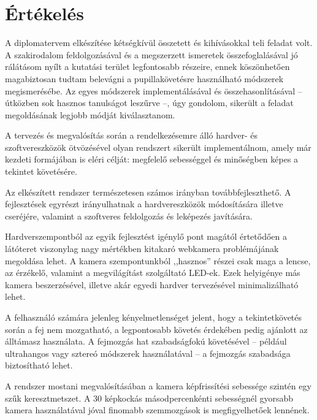 \chapter*{Értékelés}\label{sect:ertekeles}

A diplomatervem elkészítése kétségkívül összetett és kihívásokkal teli feladat volt. A szakirodalom feldolgozásával és a megszerzett ismeretek összefoglalásával jó rálátásom nyílt a kutatási terület legfontosabb részeire, ennek köszönhetően magabiztosan tudtam belevágni a pupillakövetésre használható módszerek megismerésébe. Az egyes módszerek implementálásával és összehasonlításával -- útközben sok hasznos tanulságot leszűrve --, úgy gondolom, sikerült a feladat megoldásának legjobb módját kiválasztanom.

A tervezés és megvalósítás során a rendelkezésemre álló hardver- és szoftvereszközök ötvözésével olyan rendszert sikerült implementálnom, amely már kezdeti formájában is eléri célját: megfelelő sebességgel és minőségben képes a tekintet követésére.

\bigskip

Az elkészített rendszer természetesen számos irányban továbbfejleszthető. A fejlesztések egyrészt irányulhatnak a hardvereszközök módosítására illetve cseréjére, valamint a szoftveres feldolgozás és leképezés javítására.

Hardverszempontból az egyik fejlesztést igénylő pont magától értetődően a látóteret viszonylag nagy mértékben kitakaró webkamera problémájának megoldása lehet. A kamera szempontunkból ,,hasznos'' részei csak maga a lencse, az érzékelő, valamint a megvilágítást szolgáltató LED-ek. Ezek helyigénye más kamera beszerzésével, illetve akár egyedi hardver tervezésével minimalizálható lehet.

A felhasználó számára jelenleg kényelmetlenséget jelent, hogy a tekintetkövetés során a fej nem mozgatható, a legpontosabb követés érdekében pedig ajánlott az álltámasz használata. A fejmozgás hat szabadságfokú követésével -- például ultrahangos vagy sztereó módszerek használatával -- a fejmozgás szabadsága biztosítható lehet. 

A rendszer mostani megvalósításában a kamera képfrissítési sebessége szintén egy szűk keresztmetszet. A 30 képkockás másodpercenkénti sebességnél gyorsabb kamera használatával jóval finomabb szemmozgások is megfigyelhetőek lennének.

